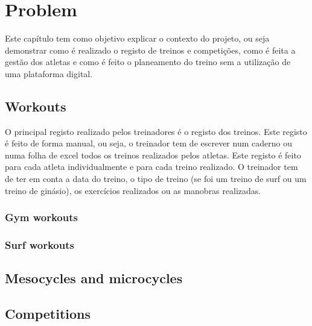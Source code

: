 %
%
\chapter{Problem} \label{cap:Problem}

Este capítulo tem como objetivo explicar o contexto do projeto, ou seja demonstrar como é realizado o registo de treinos e competições, como é feita a gestão dos atletas e como é feito o planeamento do treino sem a utilização de uma plataforma digital.

\section{Workouts}

O principal registo realizado pelos treinadores é o registo dos treinos. Este registo é feito de forma manual, ou seja, o treinador tem de escrever num caderno ou numa folha de excel todos os treinos realizados pelos atletas. Este registo é feito para cada atleta individualmente e para cada treino realizado. O treinador tem de ter em conta a data do treino, o tipo de treino (se foi um treino de surf ou um treino de ginásio), os exercícios realizados ou as manobras realizadas.


\subsection{Gym workouts}

\subsection{Surf workouts}

\section{Mesocycles and microcycles}
\lipsum[3-5]



\section{Competitions}

